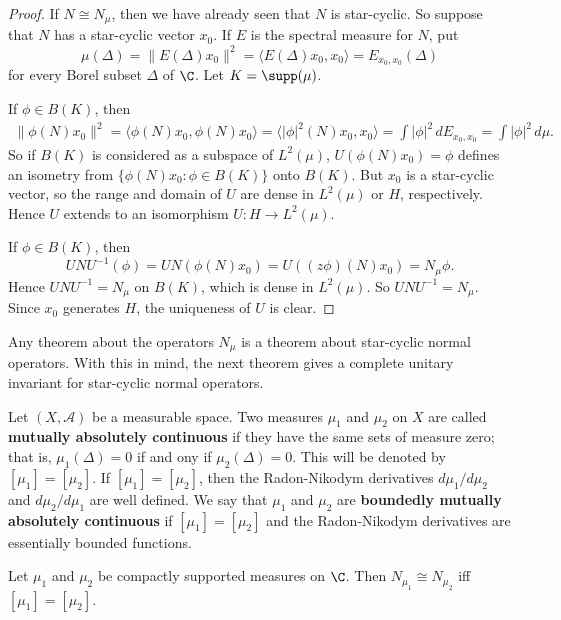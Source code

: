 \begin{proof}
If $N\cong N_\mu$, then we have already seen that $N$ is star-cyclic. So suppose that $N$ has a star-cyclic vector $x_0$. If $E$ is the spectral measure for $N$, put
\[\mu(\Delta)=\|E(\Delta)x_0\|^2=\langle E(\Delta)x_0,x_0\rangle=E_{x_0,x_0}(\Delta)\]
for every Borel subset $\Delta$ of $\C$. Let $K=\supp(\mu)$.\par
If $\phi\in B(K)$, then
\begin{align*}
\|\phi(N)x_0\|^2=\langle\phi(N)x_0,\phi(N)x_0\rangle=\langle|\phi|^2(N)x_0,x_0\rangle=\int|\phi|^2\,dE_{x_0,x_0}=\int|\phi|^2\,d\mu.
\end{align*}
So if $B(K)$ is considered as a subspace of $L^2(\mu)$, $U(\phi(N)x_0)=\phi$ defines an isometry from $\{\phi(N)x_0:\phi\in B(K)\}$ onto $B(K)$. But $x_0$ is a star-cyclic vector, so the range and domain of $U$ are dense in $L^2(\mu)$ or $H$, respectively. Hence $U$ extends to an isomorphism $U:H\to L^2(\mu)$.\par
If $\phi\in B(K)$, then
\[UNU^{-1}(\phi)=UN(\phi(N)x_0)=U((z\phi)(N)x_0)=N_\mu\phi.\]
Hence $UNU^{-1}=N_\mu$ on $B(K)$, which is dense in $L^2(\mu)$. So $UNU^{-1}=N_\mu$. Since $x_0$ generates $H$, the uniqueness of $U$ is clear.
\end{proof}
Any theorem about the operators $N_\mu$ is a theorem about star-cyclic normal operators. With this in mind, the next theorem gives a complete unitary invariant for star-cyclic normal operators.
\begin{definition}
Let $(X,\mathcal{A})$ be a measurable space. Two measures $\mu_1$ and $\mu_2$ on $X$ are called \textbf{mutually absolutely continuous} if they have the same sets of measure zero; that is, $\mu_1(\Delta)=0$ if and ony if $\mu_2(\Delta)=0$. This will be denoted by $[\mu_1]=[\mu_2]$. If $[\mu_1]=[\mu_2]$, then the Radon-Nikodym derivatives $d\mu_1/d\mu_2$ and $d\mu_2/d\mu_1$ are well defined. We say that $\mu_1$ and $\mu_2$ are \textbf{boundedly mutually absolutely continuous} if $[\mu_1]=[\mu_2]$ and the Radon-Nikodym derivatives are essentially bounded functions.
\end{definition}
\begin{theorem}\label{L^2 space multiplication by identity equivalent iff}
Let $\mu_1$ and $\mu_2$ be compactly supported measures on $\C$. Then $N_{\mu_1}\cong N_{\mu_2}$ iff $[\mu_1]=[\mu_2]$.
\end{theorem}
